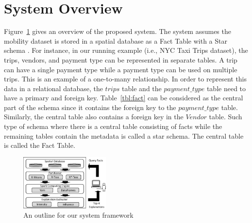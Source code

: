 \section{System Overview}
Figure~\ref{fig:framework} gives an overview of the proposed system. 
The system assumes the mobility dataset is stored in a spatial database as a Fact Table with a Star schema \cite{giovinazzo2000object,adamson2010star}. 
For instance, in our running example (i.e., NYC Taxi Trips dataset), the trips, vendors, and payment type can be represented in separate tables. A trip can have a single payment type while a payment type can be used on multiple trips. This is an example of a one-to-many relationship. 
In order to represent this data in a relational database, the $trips$ table and the $payment\_type$ table need to have a primary and foreign key. Table~\ref{tbl:fact} can be considered as the central part of the schema since it contains the foreign key to the $payment\_type$ table. Similarly, the central table also contains a foreign key in the $Vendor$ table. Such type of schema where there is a central table consisting of facts while the remaining tables contain the metadata is called a star schema. The central table is called the Fact Table. 


\begin{figure}[t]
	\centering
	\includegraphics[width=0.4\textwidth]{images/architecture.eps}
	\caption{An outline for our system framework}
	\label{fig:framework}
\end{figure}




